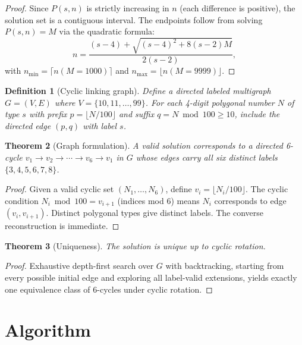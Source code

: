 \documentclass[12pt,a4paper]{article}
\newtheorem{theorem}{Theorem}
\newtheorem{definition}[theorem]{Definition}
\begin{document}
\begin{proof}
Since $P(s,n)$ is strictly increasing in $n$ (each difference is positive), the solution set is a contiguous interval. The endpoints follow from solving $P(s,n) = M$ via the quadratic formula:
\[
n = \frac{(s-4) + \sqrt{(s-4)^2 + 8(s-2)M}}{2(s-2)},
\]
with $n_{\min} = \lceil n(M{=}1000) \rceil$ and $n_{\max} = \lfloor n(M{=}9999) \rfloor$.
\end{proof}

\begin{definition}[Cyclic linking graph]
Define a directed labeled multigraph $G = (V, E)$ where $V = \{10, 11, \ldots, 99\}$. For each 4-digit polygonal number $N$ of type $s$ with prefix $p = \lfloor N/100 \rfloor$ and suffix $q = N \bmod 100 \ge 10$, include the directed edge $(p, q)$ with label $s$.
\end{definition}

\begin{theorem}[Graph formulation]
A valid solution corresponds to a directed 6-cycle $v_1 \to v_2 \to \cdots \to v_6 \to v_1$ in $G$ whose edges carry all six distinct labels $\{3,4,5,6,7,8\}$.
\end{theorem}

\begin{proof}
Given a valid cyclic set $(N_1, \ldots, N_6)$, define $v_i = \lfloor N_i/100 \rfloor$. The cyclic condition $N_i \bmod 100 = v_{i+1}$ (indices mod 6) means $N_i$ corresponds to edge $(v_i, v_{i+1})$. Distinct polygonal types give distinct labels. The converse reconstruction is immediate.
\end{proof}

\begin{theorem}[Uniqueness]
The solution is unique up to cyclic rotation.
\end{theorem}

\begin{proof}
Exhaustive depth-first search over $G$ with backtracking, starting from every possible initial edge and exploring all label-valid extensions, yields exactly one equivalence class of 6-cycles under cyclic rotation.
\end{proof}

\section{Algorithm}
\end{document}
